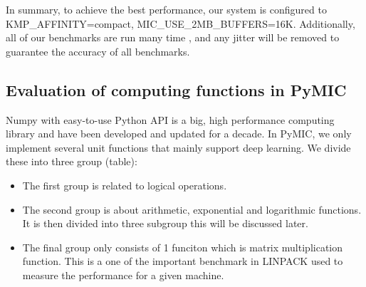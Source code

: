 In summary, to achieve the best performance,  our system is configured to KMP\_AFFINITY=compact, MIC\_USE\_2MB\_BUFFERS=16K. Additionally,  all of our benchmarks are run many time , and any jitter will be removed to guarantee the accuracy of all benchmarks.

\subsection{Evaluation of computing functions in PyMIC}
Numpy with easy-to-use Python API is a big, high performance computing library and have been developed and updated for a decade. In PyMIC, we only implement several unit functions that mainly support deep learning. We divide these into three group (table):
\begin{itemize}
	\item The first group is related to logical operations.
	\item The second group is about arithmetic, exponential and logarithmic functions. It is then divided into three subgroup this will be discussed later. 
	\item The final group only consists of 1 funciton which is matrix multiplication function. This is a one of the important benchmark in LINPACK used to measure the performance for a given machine.
\end{itemize}

